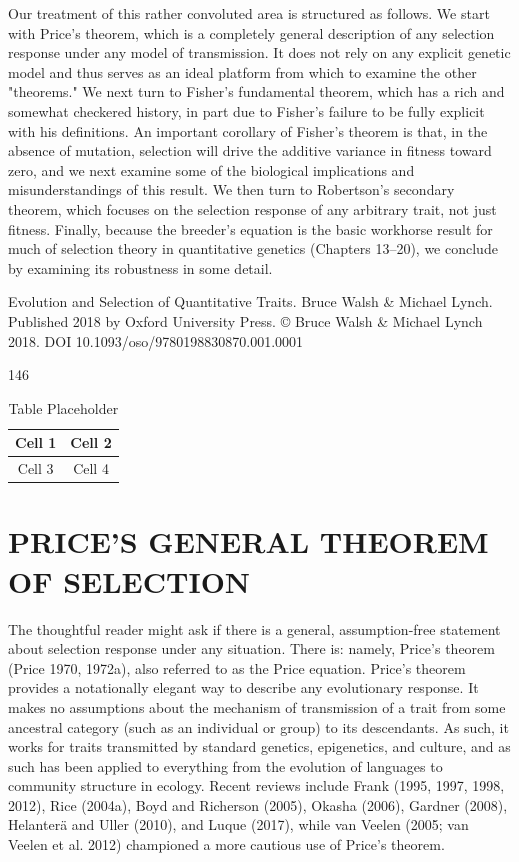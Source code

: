 \documentclass{article}
\begin{document}
Our treatment of this rather convoluted area is structured as follows. We start with Price's theorem, which is a completely general description of any selection response under any model of transmission. It does not rely on any explicit genetic model and thus serves as an ideal platform from which to examine the other "theorems." We next turn to Fisher's fundamental theorem, which has a rich and somewhat checkered history, in part due to Fisher's failure to be fully explicit with his definitions. An important corollary of Fisher's theorem is that, in the absence of mutation, selection will drive the additive variance in fitness toward zero, and we next examine some of the biological implications and misunderstandings of this result. We then turn to Robertson's secondary theorem, which focuses on the selection response of any arbitrary trait, not just fitness. Finally, because the breeder's equation is the basic workhorse result for much of selection theory in quantitative genetics (Chapters 13–20), we conclude by examining its robustness in some detail.

Evolution and Selection of Quantitative Traits. Bruce Walsh & Michael Lynch. Published 2018 by Oxford University Press. © Bruce Walsh & Michael Lynch 2018. DOI 10.1093/oso/9780198830870.001.0001

146

\begin{table}[h]
\centering
\begin{tabular}{|c|c|}
\hline
Cell 1 & Cell 2 \\
\hline
Cell 3 & Cell 4 \\
\hline
\end{tabular}
\caption{Table Placeholder}
\end{table}

\section{PRICE'S GENERAL THEOREM OF SELECTION}
The thoughtful reader might ask if there is a general, assumption-free statement about selection response under any situation. There is: namely, Price's theorem (Price 1970, 1972a), also referred to as the Price equation. Price's theorem provides a notationally elegant way to describe any evolutionary response. It makes no assumptions about the mechanism of transmission of a trait from some ancestral category (such as an individual or group) to its descendants. As such, it works for traits transmitted by standard genetics, epigenetics, and culture, and as such has been applied to everything from the evolution of languages to community structure in ecology. Recent reviews include Frank (1995, 1997, 1998, 2012), Rice (2004a), Boyd and Richerson (2005), Okasha (2006), Gardner (2008), Helanterä and Uller (2010), and Luque (2017), while van Veelen (2005; van Veelen et al. 2012) championed a more cautious use of Price's theorem.
\end{document}
